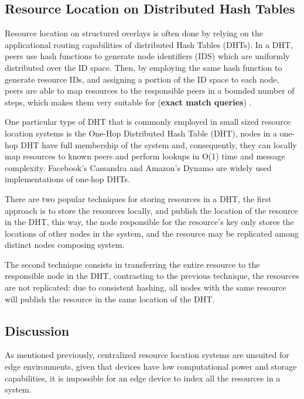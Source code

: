 \subsection{Resource Location on Distributed Hash Tables}

Resource location on structured overlays is often done by relying on the applicational routing capabilities of distributed Hash Tables (DHTs). In a DHT, peers use hash functions to generate node identifiers (IDS) which are uniformly distributed over the ID space. Then, by employing the same hash function to generate resource IDs, and assigning a portion of the ID space to each node, peers are able to map resources to the responsible peers in a bounded number of steps, which makes them very suitable for (\textbf{exact match queries}) \cite{leitaoPHDthesis}. 

One particular type of DHT that is commonly employed in small sized resource location systems is the One-Hop Distributed Hash Table (DHT), nodes in a one-hop DHT have full membership of the system and, consequently, they can locally map resources to known peers and perform lookups in O(1) time and message complexity. Facebook's Cassandra \cite{lakshman2010cassandra} and Amazon's Dynamo \cite{decandia2007dynamo} are widely used implementations of one-hop DHTs. 

There are two popular techniques for storing resources in a DHT, the first approach is to store the resources locally, and publish the location of the resource in the DHT, this way, the node responsible for the resource's key only stores the locations of other nodes in the system, and the resource may be replicated among distinct nodes composing system. 

The second technique consists in transferring the entire resource to the responsible node in the DHT, contrasting to the previous technique, the resources are not replicated: due to consistent hashing, all nodes with the same resource will publish the resource in the same location of the DHT.

\subsection{Discussion}

As mentioned previously, centralized resource location systems are unsuited for edge environments, given that devices have low computational power and storage capabilities, it is impossible for an edge device to index all the resources in a system.

